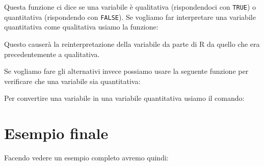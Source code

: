 

Questa funzione ci dice se una variabile è qualitativa (rispondendoci con
\texttt{TRUE}) o quantitativa (rispondendo con \texttt{FALSE}). Se vogliamo far
interpretare una variabile quantitativa come qualitativa usiamo la funzione:



Questo causerà la reinterpretazione della variabile da parte di R da quello che
era precedentemente a qualitativa.

Se vogliamo fare gli alternativi invece possiamo usare la seguente funzione per
verificare che una variabile sia quantitativa:



Per convertire una variabile in una variabile quantitativa usiamo il comando:



\section{Esempio finale}

Facendo vedere un esempio completo avremo quindi:


